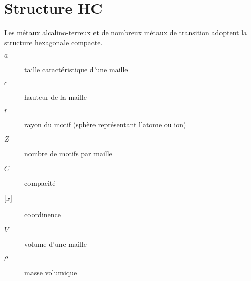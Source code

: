 \section{Structure HC}
Les métaux alcalino-terreux et de nombreux métaux de transition
adoptent la structure hexagonale compacte.
\begin{description}
    \item[$a$] taille caractéristique d'une maille
    \item[$c$] hauteur de la maille
    \item[$r$] rayon du motif (sphère représentant l'atome ou ion)
    \item[$Z$] nombre de motifs par maille
    \item[$C$] compacité
    \item[$\lbrack x \rbrack$] coordinence
    \item[$V$] volume d'une maille
    \item[$\rho$] masse volumique
\end{description}
